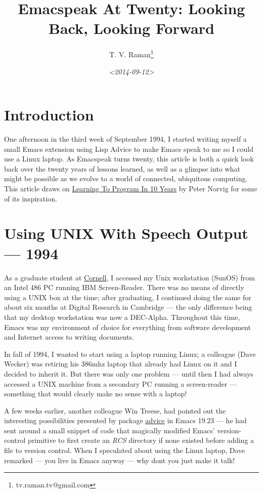 \documentclass[11pt]{article}
\author{T. V. Raman\thanks{tv.raman.tv@gmail.com}}
\date{\textit{<2014-09-12>}}
\title{Emacspeak At Twenty: Looking Back, Looking Forward}
\begin{document}
\maketitle
\tableofcontents

\section{Introduction}
\label{sec-1}

One afternoon in the third week of September 1994, I started
writing myself a small Emacs extension using Lisp Advice to make
Emacs speak to me so I could use a Linux laptop. As Emacspeak
turns twenty, this article is both a quick look back over the
twenty years of lessons learned, as well as a glimpse into what
might be possible as we evolve to a world of connected,
ubiquitous computing. This article draws on \href{http://norvig.com/21-days.html}{Learning To Program
In 10 Years} by Peter Norvig for some of its inspiration.

\section{Using UNIX With Speech Output —  1994}
\label{sec-2}

As a graduate student at \href{http://www.cs.cornell.edu/info/people/raman/raman.html}{Cornell}, I accessed my Unix workstation
(SunOS) from an Intel 486 PC running IBM Screen-Reader. There was
no means of directly using a UNIX box at the time; after
graduating, I continued doing the same for about six months at
Digital Research in Cambridge — the only difference being that my
desktop workstation was now a DEC-Alpha. Throughout this time,
Emacs was my environment of choice for everything from software
development and Internet access to writing documents.


In fall of 1994, I wanted to start using a laptop running Linux;
a colleague (Dave Wecker) was retiring his 386mhz laptop that
already had Linux on it and I decided to inherit it. But there
was only one problem — until then I had always accessed a UNIX
machine from a secondary PC running a screen-reader — something
that would clearly make no sense with a laptop!

A few weeks earlier, another colleague Win Treese, had pointed
out the interesting possibilities presented by package \uline{advice}  in
Emacs 19.23 — he had sent around a small snippet of code that
magically modified Emacs' version-control primitive to first
create an \emph{RCS} directory if none existed before adding a file to
version control. When I speculated about using the Linux laptop,
Dave remarked — you live in Emacs anyway — why dont you just make
it talk!
\end{document}
